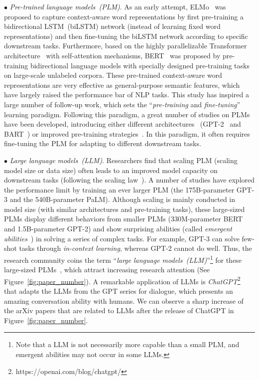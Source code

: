  
$\bullet$ \emph{Pre-trained language models~(PLM)}. As an early attempt,  ELMo~\cite{Peters-NAACL-2018} was proposed to  capture  context-aware word representations by first pre-training a bidirectional LSTM~(biLSTM)  network ({instead of learning fixed word representations}) and then fine-tuning the biLSTM network according to specific downstream tasks.  Furthermore, based on the highly parallelizable Transformer 
architecture~\cite{Vaswani-NIPS-2017-Attention} with self-attention mechanisms, 
BERT~\cite{Devlin-NAACL-2019-BERT} was proposed by  pre-training  bidirectional language models with specially designed pre-training tasks on large-scale unlabeled corpora.  These pre-trained context-aware word representations are very effective as general-purpose semantic features, which have largely raised the performance bar of NLP tasks. This study has inspired a large number of follow-up work, which sets the ``\emph{pre-training} and \emph{fine-tuning}'' learning paradigm. 
Following this paradigm, a great number of studies on PLMs have been developed, introducing either different architectures~\cite{Lewis-ACL-2020-BART,Fedus-JMLR-2021-Switch} (\eg GPT-2~\cite{radford-blog-2019-language} and BART~\cite{Lewis-ACL-2020-BART}) or improved pre-training strategies~\cite{Liu-CoRR-2019-RoBERTa,Sanh-ICLR-2022-Multitask,Wang-ICML-2022-What}. In this paradigm, it often requires fine-tuning the PLM for adapting to different downstream tasks.  

$\bullet$ \emph{Large language models~(LLM)}. Researchers find that scaling PLM (\eg scaling model size or data size)  often leads to an improved model capacity on downstream tasks (\ie following the scaling law~\cite{Kaplan-arxiv-2020-Scaling}). A number of studies have explored the performance limit by training an ever larger PLM (\eg the 175B-parameter GPT-3 and the 540B-parameter PaLM). Although scaling is mainly conducted in model size (with similar architectures and pre-training tasks), these large-sized PLMs display different behaviors from smaller PLMs (\eg 330M-parameter BERT and 1.5B-parameter GPT-2) and show surprising abilities (called \emph{emergent abilities}~\cite{Wei-arxiv-2022-Emergent}) in solving a series of complex tasks. 
For example, GPT-3 can  solve few-shot tasks through \emph{in-context learning}, whereas GPT-2 cannot do well. 
Thus, the research community coins the  term  ``\emph{large language models~(LLM)}''\footnote{Note that a LLM is not necessarily more capable than a small PLM, and  emergent abilities may not  occur in some LLMs. } for these large-sized PLMs~\cite{Shanahan-arxiv-2022-Talking,Wei-arxiv-2022-chain,Hoffmann-arxiv-2022-Training,Taylor-arxiv-2022-Galactica}, which attract  increasing   research attention (See Figure~\ref{fig:paper_number}). 
A remarkable application of LLMs is \emph{ChatGPT}\footnote{https://openai.com/blog/chatgpt/}  that adapts the LLMs from the GPT series for dialogue, which presents an amazing conversation ability with humans. We can observe a sharp increase of the  arXiv papers that are related to LLMs after the release of ChatGPT in Figure~\ref{fig:paper_number}.

